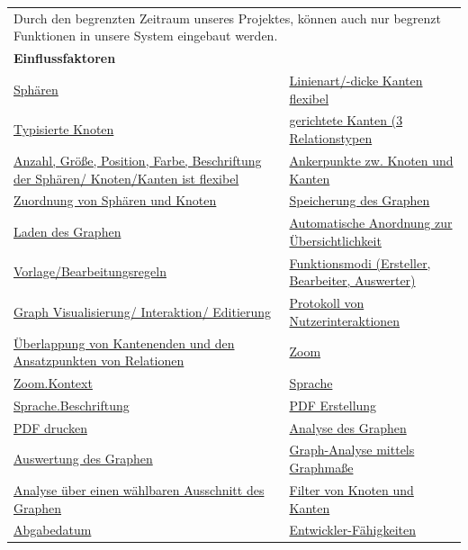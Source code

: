 \documentclass[enabledeprecatedfontcommands,fontsize=11pt,paper=a4,twoside]{scrartcl}
\newcounter{one}
\begin{document}
	\newpage
	\begin{tabular} {|p{8cm} p{8cm}|}
		\hline
		\rowcolor{prob}\multicolumn{2}{|l|}{\parbox{16cm}{\textbf{16: Begrenzter Funktionsumfang durch Bearbeitungszeit}}} \\  \hline\hline 
		\multicolumn{2}{|l|}{\parbox{16cm}{Durch den begrenzten Zeitraum unseres Projektes, können auch nur begrenzt Funktionen in unsere System eingebaut werden.}}\rule{0pt}{4ex}\\ [1ex] \hline
		\multicolumn{2}{|l|}{\textbf{Einflussfaktoren}}\\
		\hyperlink {n}{Sphären} &
		\hyperlink {o}{Linienart/-dicke Kanten flexibel}\\
		\hyperlink {p}{Typisierte Knoten} &
		\hyperlink {q}{gerichtete Kanten (3 Relationstypen} \\
		\hyperlink {r}{Anzahl, Größe, Position, Farbe, Beschriftung der Sphären/ Knoten/Kanten ist flexibel} &
		\hyperlink {s}{Ankerpunkte zw. Knoten und Kanten} \\
		\hyperlink {t}{Zuordnung von Sphären und Knoten} &
		\hyperlink {v}{Speicherung des Graphen} \\
		\hyperlink {w}{Laden des Graphen} &
		\hyperlink {x}{Automatische Anordnung zur Übersichtlichkeit} \\
		\hyperlink {y}{Vorlage/Bearbeitungsregeln} &
		\hyperlink {z}{Funktionsmodi (Ersteller, Bearbeiter, Auswerter)} \\
		\hyperlink {aa}{Graph Visualisierung/ Interaktion/ Editierung}&
		\hyperlink {bb}{Protokoll von Nutzerinteraktionen} \\
		\hyperlink {cc}{Überlappung von Kantenenden und den Ansatzpunkten von Relationen} &
		\hyperlink {ee}{Zoom} \\
		\hyperlink {ff}{Zoom.Kontext} &
		\hyperlink {gg}{Sprache} \\
		\hyperlink {hh}{Sprache.Beschriftung} &
		\hyperlink {kk}{PDF Erstellung} \\
		\hyperlink {ll}{PDF drucken} &
		\hyperlink {oo}{Analyse des Graphen} \\
		\hyperlink {pp}{Auswertung des Graphen} &
		\hyperlink {qq}{Graph-Analyse mittels Graphmaße} \\ 
		\hyperlink {rr}{Analyse über einen wählbaren Ausschnitt des Graphen} &
		\hyperlink {ss}{Filter von Knoten und Kanten} \\
		\hyperlink {uu}{Abgabedatum} &
		\hyperlink {vv}{Entwickler-Fähigkeiten} \\

\end{tabular}
\end{document}
